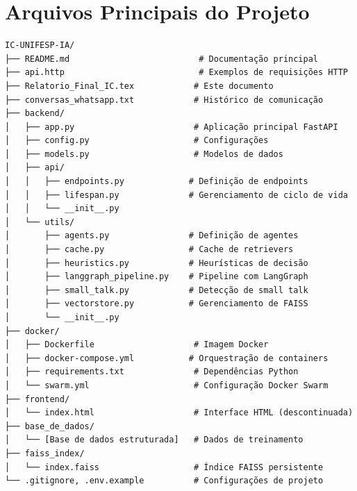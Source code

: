\documentclass[12pt,a4paper]{report}
\begin{document}
\chapter{Arquivos Principais do Projeto}

\begin{verbatim}
IC-UNIFESP-IA/
├── README.md                          # Documentação principal
├── api.http                           # Exemplos de requisições HTTP
├── Relatorio_Final_IC.tex            # Este documento
├── conversas_whatsapp.txt            # Histórico de comunicação
├── backend/
│   ├── app.py                        # Aplicação principal FastAPI
│   ├── config.py                     # Configurações
│   ├── models.py                     # Modelos de dados
│   ├── api/
│   │   ├── endpoints.py             # Definição de endpoints
│   │   ├── lifespan.py              # Gerenciamento de ciclo de vida
│   │   └── __init__.py
│   └── utils/
│       ├── agents.py                # Definição de agentes
│       ├── cache.py                 # Cache de retrievers
│       ├── heuristics.py            # Heurísticas de decisão
│       ├── langgraph_pipeline.py    # Pipeline com LangGraph
│       ├── small_talk.py            # Detecção de small talk
│       ├── vectorstore.py           # Gerenciamento de FAISS
│       └── __init__.py
├── docker/
│   ├── Dockerfile                    # Imagem Docker
│   ├── docker-compose.yml           # Orquestração de containers
│   ├── requirements.txt              # Dependências Python
│   └── swarm.yml                     # Configuração Docker Swarm
├── frontend/
│   └── index.html                    # Interface HTML (descontinuada)
├── base_de_dados/
│   └── [Base de dados estruturada]   # Dados de treinamento
├── faiss_index/
│   └── index.faiss                   # Índice FAISS persistente
└── .gitignore, .env.example          # Configurações de projeto
\end{verbatim}
\end{document}
